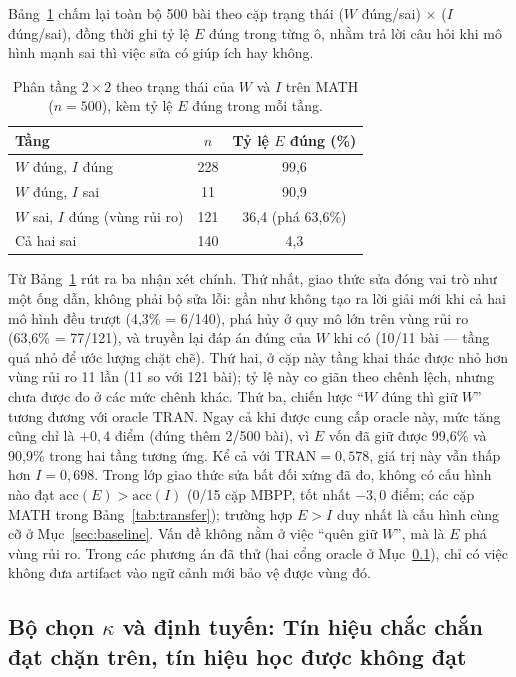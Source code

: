 \documentclass[12pt,a4paper]{article}
\newcommand{\CEIL}{\mathrm{TRAN}}
\newcommand{\acc}{\mathrm{acc}}
\begin{document}
Bảng~\ref{tab:222} chấm lại toàn bộ 500 bài theo cặp trạng thái (\(W\) đúng/sai) \(\times\) (\(I\) đúng/sai), đồng thời ghi tỷ lệ \(E\) đúng trong từng ô, nhằm trả lời câu hỏi khi mô hình mạnh sai thì việc sửa có giúp ích hay không.

\begin{table}[htbp]
\centering
\small
\begin{tabular}{@{}l c c@{}}
\toprule
Tầng & \(n\) & Tỷ lệ \(E\) đúng (\%) \\
\midrule
\(W\) đúng, \(I\) đúng & 228 & 99,6\\
\(W\) đúng, \(I\) sai & 11 & 90,9\\
\(W\) sai, \(I\) đúng (vùng rủi ro) & 121 & 36,4 \quad (phá 63,6\%)\\
Cả hai sai & 140 & 4,3\\
\bottomrule
\end{tabular}
\caption{Phân tầng \(2\times 2\) theo trạng thái của \(W\) và \(I\) trên MATH (\(n=500\)), kèm tỷ lệ \(E\) đúng trong mỗi tầng.}
\label{tab:222}
\end{table}

Từ Bảng~\ref{tab:222} rút ra ba nhận xét chính. Thứ nhất, giao thức sửa đóng vai trò như một ống dẫn, không phải bộ sửa lỗi: gần như không tạo ra lời giải mới khi cả hai mô hình đều trượt (4,3\% = 6/140), phá hủy ở quy mô lớn trên vùng rủi ro (63,6\% = 77/121), và truyền lại đáp án đúng của \(W\) khi có (10/11 bài --- tầng quá nhỏ để ước lượng chặt chẽ). Thứ hai, ở cặp này tầng khai thác được nhỏ hơn vùng rủi ro 11 lần (11 so với 121 bài); tỷ lệ này co giãn theo chênh lệch, nhưng chưa được đo ở các mức chênh khác. Thứ ba, chiến lược “\(W\) đúng thì giữ \(W\)” tương đương với oracle \(\CEIL\). Ngay cả khi được cung cấp oracle này, mức tăng cũng chỉ là \(+0{,}4\) điểm (đúng thêm 2/500 bài), vì \(E\) vốn đã giữ được 99,6\% và 90,9\% trong hai tầng tương ứng. Kể cả với \(\CEIL = 0{,}578\), giá trị này vẫn thấp hơn \(I = 0{,}698\). Trong lớp giao thức sửa bất đối xứng đã đo, không có cấu hình nào đạt \(\acc(E) > \acc(I)\) (0/15 cặp MBPP, tốt nhất \(-3{,}0\) điểm; các cặp MATH trong Bảng~\ref{tab:transfer}); trường hợp \(E>I\) duy nhất là cấu hình cùng cỡ ở Mục~\ref{sec:baseline}. Vấn đề không nằm ở việc “quên giữ \(W\)”, mà là \(E\) phá vùng rủi ro. Trong các phương án đã thử (hai cổng oracle ở Mục~\ref{sec:kappa}), chỉ có việc không đưa artifact vào ngữ cảnh mới bảo vệ được vùng đó.

\subsection{Bộ chọn \(\kappa\) và định tuyến: Tín hiệu chắc chắn đạt chặn trên, tín hiệu học được không đạt}\label{sec:kappa}
\end{document}
